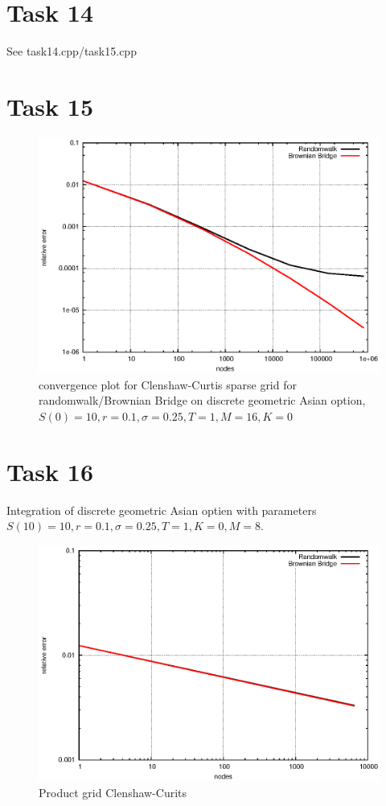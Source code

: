 \documentclass[]{article}
\begin{document}
\section*{Task 14}
See task14.cpp/task15.cpp

\section*{Task 15}
\begin{figure}[!ht]
\centering
\includegraphics{task15}
\caption{convergence plot for Clenshaw-Curtis sparse grid for randomwalk/Brownian Bridge on discrete geometric Asian option, $S(0)=10,r=0.1,\sigma=0.25,T=1,M=16,K=0$}
\label{fig:Task15}
\end{figure}
\clearpage

\section*{Task 16}
Integration of discrete geometric Asian optien with parameters $S(10)=10,r=0.1,\sigma=0.25,T=1,K=0,M=8$.

\begin{figure}[!ht]
\centering
\includegraphics{task16_ccprod}
\caption{Product grid Clenshaw-Curits}
\label{fig:Task16a}
\end{figure}
\end{document}
